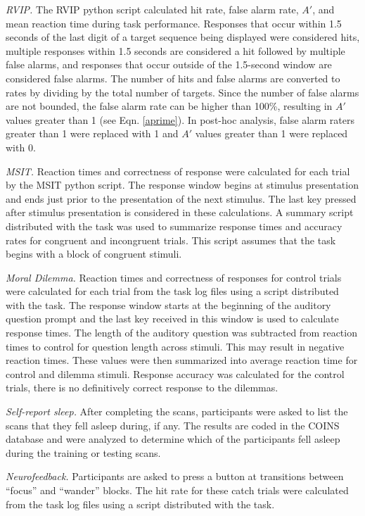 \emph{RVIP.} The RVIP python script calculated hit rate, false alarm rate, $A'$, and mean reaction time during task performance. Responses that occur within 1.5 seconds of the last digit of a target sequence being displayed were considered hits, multiple responses within 1.5 seconds are considered a hit followed by multiple false alarms, and responses that occur outside of the 1.5-second window are considered false alarms. The number of hits and false alarms are converted to rates by dividing by the total number of targets. Since the number of false alarms are not bounded, the false alarm rate can be higher than 100\%, resulting in $A'$ values greater than 1 (see Eqn. \ref{aprime}). In post-hoc analysis, false alarm raters greater than 1 were replaced with 1 and $A'$ values greater than 1 were replaced with 0.

\emph{MSIT.} Reaction times and correctness of response were calculated for each trial by the MSIT python script. The response window begins at stimulus presentation and ends just prior to the presentation of the next stimulus. The last key pressed after stimulus presentation is considered in these calculations. A summary script distributed with the task was used to summarize response times and accuracy rates for congruent and incongruent trials. This script assumes that the task begins with a block of congruent stimuli.

\emph{Moral Dilemma.} Reaction times and correctness of responses for control trials were calculated for each trial from the task log files using a script distributed with the task. The response window starts at the beginning of the auditory question prompt and the last key received in this window is used to calculate response times. The length of the auditory question was subtracted from reaction times to control for question length across stimuli. This may result in negative reaction times. These values were then summarized into average reaction time for control and dilemma stimuli. Response accuracy was calculated for the control trials, there is no definitively correct response to the dilemmas.

\emph{Self-report sleep.} After completing the scans, participants were asked to list the scans that they fell asleep during, if any. The results are coded in the COINS database and were analyzed to determine which of the participants fell asleep during the training or testing scans.

\emph{Neurofeedback.} Participants are asked to press a button at transitions between “focus” and “wander” blocks. The hit rate for these catch trials were calculated from the task log files using a script distributed with the task.

